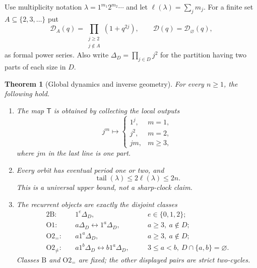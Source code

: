 \documentclass[10pt,a4paper]{amsart}
\newtheorem{theorem}{Theorem}[section]
\theoremstyle{definition}
\theoremstyle{remark}
\newcommand{\CT}{\mathsf T}
\newcommand{\ellp}{\ell}
\newcommand{\D}{\mathcal D}
\begin{document}
Use multiplicity notation
$\lambda=1^{m_1}2^{m_2}\cdots$ and let $\ellp(\lambda)=\sum_jm_j$.
For a finite set $A\subseteq\{2,3,\ldots\}$ put
\begin{equation}\label{eq:D}
 \D_A(q)=\prod_{\substack{j\geq2\\j\notin A}}(1+q^{2j}),
 \qquad \D(q)=\D_\varnothing(q),
\end{equation}
as formal power series.  Also write
$\Delta_D=\prod_{j\in D}j^2$ for the partition having two parts of each
size in $D$.

\begin{theorem}[Global dynamics and inverse geometry]\label{thm:main}
For every $n\geq1$, the following hold.
\begin{enumerate}[label=\textup{(\roman*)}]
\item The map $\CT$ is obtained by collecting the local outputs
\begin{equation}\label{eq:local}
 j^m\longmapsto
 \begin{cases}
  1^j,&m=1,\\
  j^2,&m=2,\\
  jm,&m\geq3,
 \end{cases}
\end{equation}
where $jm$ in the last line is one part.
\item Every orbit has eventual period one or two, and
\begin{equation}\label{eq:tail}
                  \operatorname{tail}(\lambda)\leq2\ellp(\lambda)\leq2n.
\end{equation}
This is a universal upper bound, not a sharp-clock claim.
\item The recurrent objects are exactly the disjoint classes
\begin{alignat}{2}
 \mathrm B:\quad &1^e\Delta_D,
     &\quad&e\in\{0,1,2\};                                      \label{eq:B}\\
 \mathrm {O1}:\quad&a\Delta_D\longleftrightarrow1^a\Delta_D,
     &&a\geq3,\ a\notin D;                                     \label{eq:O1}\\
 \mathrm {O2}_{=}:\quad&a1^a\Delta_D,
     &&a\geq3,\ a\notin D;                                    \label{eq:O2e}\\
 \mathrm {O2}_{\ne}:\quad&a1^b\Delta_D\longleftrightarrow
 b1^a\Delta_D,
     &&3\leq a<b,\ D\cap\{a,b\}=\varnothing.                 \label{eq:O2n}
\end{alignat}
Classes $\mathrm B$ and $\mathrm {O2}_{=}$ are fixed; the other displayed
pairs are strict two-cycles.

\end{enumerate}
\end{theorem}
\end{document}
